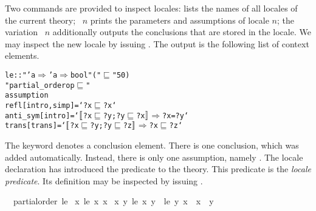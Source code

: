 \begin{isabellebody}
\begin{isamarkuptext}
  Two commands are provided to inspect locales:
   lists the names of all locales of the
  current theory; ~$n$ prints the parameters
  and assumptions of locale $n$; the variation ~$n$
  additionally outputs the conclusions that are stored in the locale.
  We may inspect the new locale
  by issuing  .  The output
  is the following list of context elements.
\begin{small}
\begin{alltt}
   le :: "'a \(\Rightarrow\) 'a \(\Rightarrow\)  bool" ( "\(\sqsubseteq\)" 50)
   "partial_order op \(\sqsubseteq\)"
   assumption
    refl [intro, simp] = `?x \(\sqsubseteq\) ?x`
    anti_sym [intro] = `\(\isasymlbrakk\)?x \(\sqsubseteq\) ?y; ?y \(\sqsubseteq\) ?x\(\isasymrbrakk\) \(\Longrightarrow\) ?x = ?y`
    trans [trans] = `\(\isasymlbrakk\)?x \(\sqsubseteq\) ?y; ?y \(\sqsubseteq\) ?z\(\isasymrbrakk\) \(\Longrightarrow\) ?x \(\sqsubseteq\) ?z`
\end{alltt}
\end{small}
  The keyword  denotes a conclusion element.  There
  is one conclusion, which was added automatically.  Instead, there is
  only one assumption, namely .  The locale
  declaration has introduced the predicate  to the theory.  This predicate is the
  \emph{locale predicate}.  Its definition may be inspected by
  issuing  .
  \begin{isabelle}%
\ \ partial{}order\ {}le\ {}\isanewline
{}x{}\ {}le\ x\ x{}\ {}\isanewline
{}x\ y{}\ {}le\ x\ y\ {}\ {}le\ y\ x\ {}\ x\ {}\ y{}\ {}\isanewline

\end{isabelle}
\end{isamarkuptext}
\end{isabellebody}
